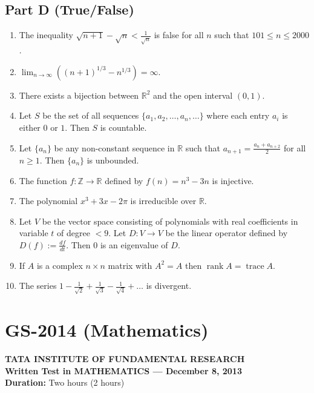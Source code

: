 \documentclass[11pt, a4paper]{article}
\begin{document}
\subsection*{Part D (True/False)}
\begin{enumerate}[resume]
  \item The inequality $\sqrt{n+1} - \sqrt{n} < \frac{1}{\sqrt{n}}$ is false for all $n$ such that $101 \le n \le 2000$.
  \item $\displaystyle \lim_{n \to \infty} \left((n + 1)^{1/3} - n^{1/3}\right) = \infty$.
  \item There exists a bijection between $\mathbb{R}^2$ and the open interval $(0, 1)$.
  \item Let $S$ be the set of all sequences $\{a_1, a_2, \dots, a_n, \dots\}$ where each entry $a_i$ is either $0$ or $1$. Then $S$ is countable.
  \item Let $\{a_n\}$ be any non-constant sequence in $\mathbb{R}$ such that $a_{n+1} = \frac{a_n + a_{n+2}}{2}$ for all $n \ge 1$. Then $\{a_n\}$ is unbounded.
  \item The function $f: \mathbb{Z} \to \mathbb{R}$ defined by $f(n) = n^3 - 3n$ is injective.
  \item The polynomial $x^3 + 3x - 2\pi$ is irreducible over $\mathbb{R}$.
  \item Let $V$ be the vector space consisting of polynomials with real coefficients in variable $t$ of degree $< 9$. Let $D: V \to V$ be the linear operator defined by $D(f) := \frac{df}{dt}$. Then $0$ is an eigenvalue of $D$.
  \item If $A$ is a complex $n \times n$ matrix with $A^2 = A$ then $\operatorname{rank} A = \operatorname{trace} A$.
  \item The series $\displaystyle 1 - \frac{1}{\sqrt{2}} + \frac{1}{\sqrt{3}} - \frac{1}{\sqrt{4}} + \dots$ is divergent.
\end{enumerate}

\newpage

\section{GS-2014 (Mathematics)}

\begin{center}
  \textbf{TATA INSTITUTE OF FUNDAMENTAL RESEARCH}\\
  \textbf{Written Test in MATHEMATICS --- December 8, 2013}\\
  \textbf{Duration:} Two hours (2 hours)
\end{center}
\end{document}
